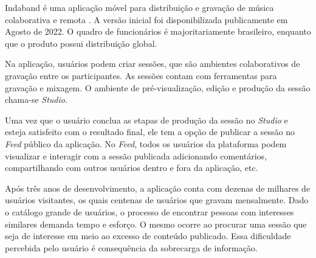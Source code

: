 Indaband é uma aplicação móvel para distribuição e gravação de música
colaborativa e remota \cite{indaband}. A versão inicial foi disponibilizada
publicamente em Agosto de 2022. O quadro de funcionários é majoritariamente
brasileiro, enquanto que o produto possui distribuição global.



Na aplicação, usuários podem criar sessões, que são ambientes colaborativos de
gravação entre os participantes. As sessões contam com ferramentas para gravação
e mixagem. O ambiente de pré-visualização, edição e produção da sessão chama-se
\textit{Studio}.

Uma vez que o usuário conclua as etapas de produção da sessão no \textit{Studio}
e esteja satisfeito com o resultado final, ele tem a opção de publicar a sessão
no \textit{Feed} público da aplicação. No \textit{Feed}, todos os usuários da
plataforma podem visualizar e interagir com a sessão publicada
adicionando comentários, compartilhando com outros usuários dentro e fora da
aplicação, etc.

Após três anos de desenvolvimento, a aplicação conta com dezenas de milhares de
usuários visitantes, os quais centenas de usuários que gravam mensalmente. Dado
o catálogo grande de usuários, o processo de encontrar pessoas com interesses
similares demanda tempo e esforço. O mesmo ocorre ao procurar uma sessão que
seja de interesse em meio ao excesso de conteúdo publicado. Essa dificuldade
percebida pelo usuário é consequência da sobrecarga de informação.

